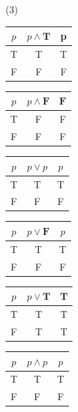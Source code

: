 \documentclass[12pt,titlepage]{extarticle}
\begin{document}
\begin{tasks}(3)
    \task\begin{tabular}{c||c||c}
        $p$ & $p \land \mathbf{T}$ & p \\\hline
        T & T & T \\\hline
        F & F & F
    \end{tabular}

    \task\begin{tabular}{c||c||c}
        $p$ & $p \land \mathbf{F}$ & $\mathbf{F}$ \\\hline
        T & F & F \\\hline
        F & F & F
    \end{tabular}

    \task\begin{tabular}{c||c||c}
        $p$ & $p \lor p$ & $p$ \\\hline
        T & T & T \\\hline
        F & F & F
    \end{tabular}

    \task\begin{tabular}{c||c||c}
        $p$ & $p \lor \mathbf{F}$ & $p$ \\\hline
        T & T & T \\\hline
        F & F & F
    \end{tabular}

    \task\begin{tabular}{c||c||c}
        $p$ & $p \lor \mathbf{T}$ & $\mathbf{T}$ \\\hline
        T & T & T \\\hline
        F & T & T
    \end{tabular}

    \task\begin{tabular}{c||c||c}
        $p$ & $p \land p$ & $p$ \\\hline
        T & T & T \\\hline
        F & F & F
    \end{tabular}
\end{tasks}
\end{document}
